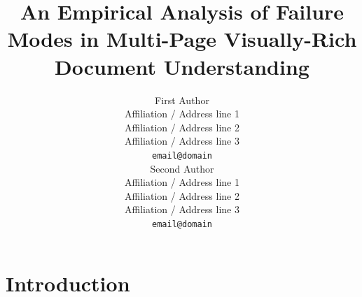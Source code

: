 \documentclass[11pt]{article}
\title{An Empirical Analysis of Failure Modes in Multi-Page Visually-Rich Document Understanding}
\author{First Author \\
  Affiliation / Address line 1 \\
  Affiliation / Address line 2 \\
  Affiliation / Address line 3 \\
  \texttt{email@domain} \\\And
  Second Author \\
  Affiliation / Address line 1 \\
  Affiliation / Address line 2 \\
  Affiliation / Address line 3 \\
  \texttt{email@domain} \\}
\begin{document}
\maketitle
\begin{abstract}
\end{abstract}

\section{Introduction}


\end{document}
